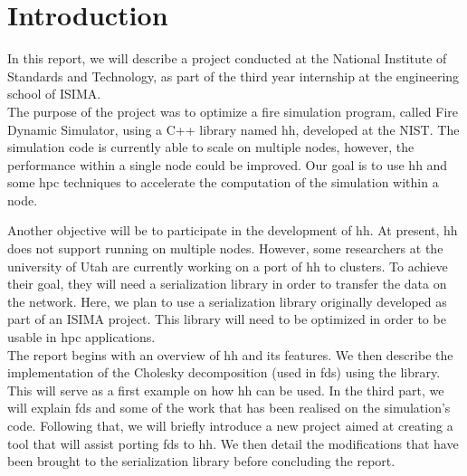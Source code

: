
\setcounter{page}{1}
\clearpage{}
\pagestyle{fancy}
\section*{Introduction}

In this report, we will describe a project conducted at the National Institute
of Standards and Technology, as part of the third year internship at the
engineering school of ISIMA.\\

The purpose of the project was to optimize a fire simulation program, called
Fire Dynamic Simulator, using a C++ library named \gls{hh}, developed at the
NIST. The simulation code is currently able to scale on multiple nodes, however,
the performance within a single node could be improved. Our goal is to use
\gls{hh} and some \gls{hpc} techniques to accelerate the computation of the
simulation within a node.

Another objective will be to participate in the development of \gls{hh}. At
present, \gls{hh} does not support running on multiple nodes. However, some
researchers at the university of Utah are currently working on a port of
\gls{hh} to clusters. To achieve their goal, they will need a serialization
library in order to transfer the data on the network. Here, we plan to use a
serialization library originally developed as part of an ISIMA project. This
library will need to be optimized in order to be usable in \gls{hpc}
applications.\\

The report begins with an overview of \gls{hh} and its features. We then
describe the implementation of the Cholesky decomposition (used in \gls{fds})
using the library. This will serve as a first example on how \gls{hh} can be
used. In the third part, we will explain \gls{fds} and some of the work that has
been realised on the simulation's code. Following that, we will briefly
introduce a new project aimed at creating a tool that will assist porting
\gls{fds} to \gls{hh}. We then detail the modifications that have been brought
to the serialization library before concluding the report.

\clearpage{}
